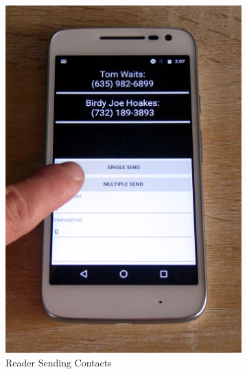\begin{figure}
	\centering
	
	\begin{subfigure}{0.49\textwidth}
		\centering
		\includegraphics[height=0.45\textheight]{graphics/PhonePhotos/07 - ReaderSend.jpg}
		\caption{Reader Sending Contacts}
		\label{fig:ReaderSend}
	\end{subfigure}
\hfill	
	\begin{subfigure}{0.49\textwidth}
		\centering

\end{subfigure}
\end{figure}

